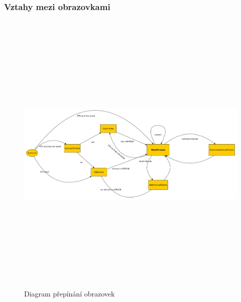 \subsubsection{Vztahy mezi obrazovkami}

\begin{figure}[H]\centering
\includegraphics[width=140mm, height=140mm]{../diagrams/frame_diagram.pdf}
\caption{Diagram přepínání obrazovek}
\label{frame-diagram}
\end{figure}

